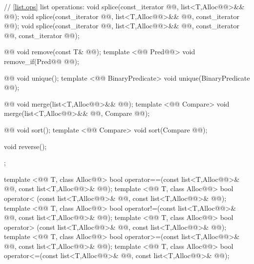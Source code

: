 \documentclass[american,twoside]{book}
\begin{document}
\begin{codeblock}
{{    // \ref{list.ops} list operations:
    void splice(const_iterator @@, list<T,Alloc@@>&& @@);
    void splice(const_iterator @@, list<T,Alloc@@>&& @@, const_iterator @@);
    void splice(const_iterator @@, list<T,Alloc@@>&& @@,
                const_iterator @@, const_iterator @@);

    @@ void remove(const T& @@);
    template <@@ Pred@@> void remove_if(Pred@@ @@);

    @@ void unique();
    template <@@ BinaryPredicate>
      void unique(BinaryPredicate @@);

    @@ void merge(list<T,Alloc@@>&& @@);
    template <@@ Compare> 
      void merge(list<T,Alloc@@>&& @@, Compare @@);

    @@ void sort();
    template <@@ Compare> void sort(Compare @@);

    void reverse();
  };

  template <@@ T, class Alloc@@>
    bool operator==(const list<T,Alloc@@>& @@, const list<T,Alloc@@>& @@);
  template <@@ T, class Alloc@@>
    bool operator< (const list<T,Alloc@@>& @@, const list<T,Alloc@@>& @@);
  template <@@ T, class Alloc@@>
    bool operator!=(const list<T,Alloc@@>& @@, const list<T,Alloc@@>& @@);
  template <@@ T, class Alloc@@>
    bool operator> (const list<T,Alloc@@>& @@, const list<T,Alloc@@>& @@);
  template <@@ T, class Alloc@@>
    bool operator>=(const list<T,Alloc@@>& @@, const list<T,Alloc@@>& @@);
  template <@@ T, class Alloc@@>
    bool operator<=(const list<T,Alloc@@>& @@, const list<T,Alloc@@>& @@);

}
\end{codeblock}
\end{document}
